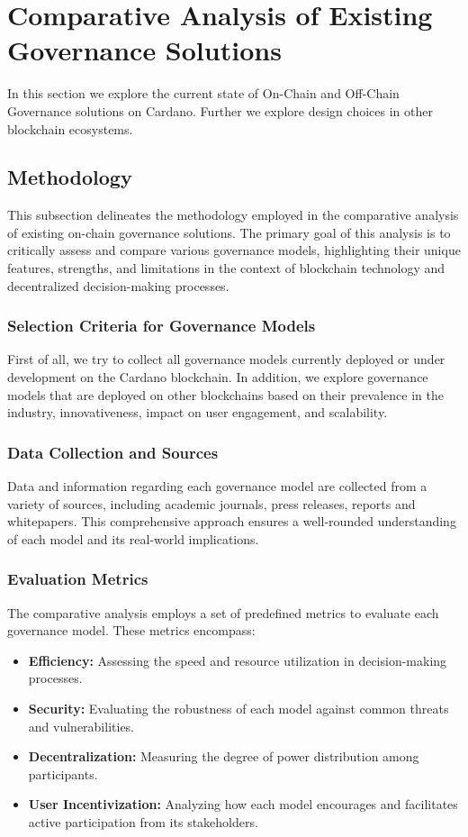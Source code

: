 \documentclass[11pt]{article}
\begin{document}
\section{Comparative Analysis of Existing Governance Solutions}

In this section we explore the current state of On-Chain and Off-Chain Governance solutions on Cardano.
Further we explore design choices in other blockchain ecosystems.

\subsection{Methodology}
This subsection delineates the methodology employed in the comparative analysis of existing on-chain governance solutions.
The primary goal of this analysis is to critically assess and compare various governance models,
highlighting their unique features, strengths, and limitations in the context of blockchain technology and decentralized decision-making processes.

\subsubsection{Selection Criteria for Governance Models}

First of all, we try to collect all governance models currently deployed or under development on the Cardano blockchain.
In addition, we explore governance models that are deployed on other blockchains based on their prevalence in the industry, innovativeness, impact on user engagement, and scalability.

\subsubsection{Data Collection and Sources}
Data and information regarding each governance model are collected from a variety of sources, including academic journals, press releases, reports and whitepapers.
This comprehensive approach ensures a well-rounded understanding of each model and its real-world implications.

\subsubsection{Evaluation Metrics}
The comparative analysis employs a set of predefined metrics to evaluate each governance model.
These metrics encompass:

\begin{itemize}
    \item \textbf{Efficiency:} Assessing the speed and resource utilization in decision-making processes.
    \item \textbf{Security:} Evaluating the robustness of each model against common threats and vulnerabilities.
    \item \textbf{Decentralization:} Measuring the degree of power distribution among participants.
    \item \textbf{User Incentivization:} Analyzing how each model encourages and facilitates active participation from its stakeholders.
\end{itemize}
\end{document}
